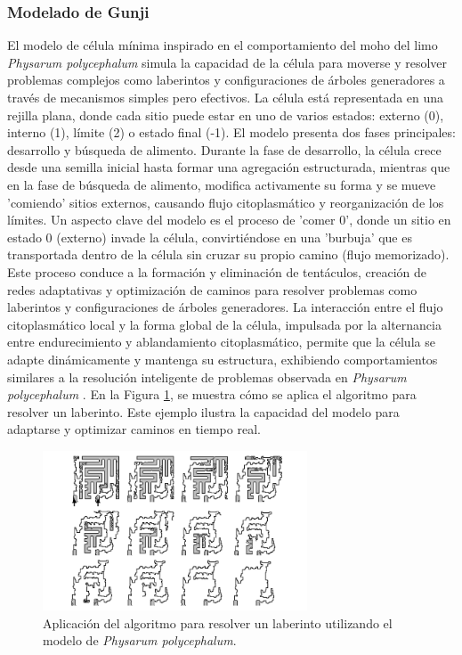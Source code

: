 \subsubsection{Modelado de Gunji} %
\label{ssub:Modelado de Gunji}

    El modelo de c\'elula m\'inima inspirado en el comportamiento del moho del limo \textit{Physarum polycephalum} 
        simula la capacidad de la c\'elula para moverse y resolver problemas complejos como laberintos y 
        configuraciones de \'arboles generadores a trav\'es de mecanismos simples pero efectivos. La c\'elula 
        est\'a representada en una rejilla plana, donde cada sitio puede estar en uno de varios estados: 
        externo (0), interno (1), l\'imite (2) o estado final (-1). El modelo presenta dos fases principales: 
        desarrollo y b\'usqueda de alimento. Durante la fase de desarrollo, la c\'elula crece desde una semilla 
        inicial hasta formar una agregaci\'on estructurada, mientras que en la fase de b\'usqueda de alimento, 
        modifica activamente su forma y se mueve 'comiendo' sitios externos, causando flujo citoplasm\'atico 
        y reorganizaci\'on de los l\'imites.
    \vskip 0.5cm
    Un aspecto clave del modelo es el proceso de 'comer 0', donde un sitio en estado 0 (externo) invade la c\'elula, 
        convirti\'endose en una 'burbuja' que es transportada dentro de la c\'elula sin cruzar su propio camino 
        (flujo memorizado). Este proceso conduce a la formaci\'on y eliminaci\'on de tent\'aculos, creaci\'on de redes 
        adaptativas y optimizaci\'on de caminos para resolver problemas como laberintos y configuraciones de 
        \'arboles generadores. La interacci\'on entre el flujo citoplasm\'atico local y la forma global de la c\'elula, 
        impulsada por la alternancia entre endurecimiento y ablandamiento citoplasm\'atico, permite que la c\'elula 
        se adapte din\'amicamente y mantenga su estructura, exhibiendo comportamientos similares a la resoluci\'on 
        inteligente de problemas observada en \textit{Physarum polycephalum} \cite{gunji2008}.
    \vskip 0.5cm
    En la Figura \ref{fig:cell_algorithm}, se muestra c\'omo se aplica el algoritmo para resolver un laberinto. 
        Este ejemplo ilustra la capacidad del modelo para adaptarse y optimizar caminos en tiempo real.
    \vskip 0.5cm
    \begin{figure}[h]
        \centering
        \includegraphics[width=0.7\textwidth]{./images/estado_del_arte/physarum/laberintoGunji.png}
        \caption{Aplicaci\'on del algoritmo para resolver un laberinto utilizando el modelo de \textit{Physarum polycephalum}. \cite{gunji2008}}
        \label{fig:cell_algorithm}
    \end{figure}
